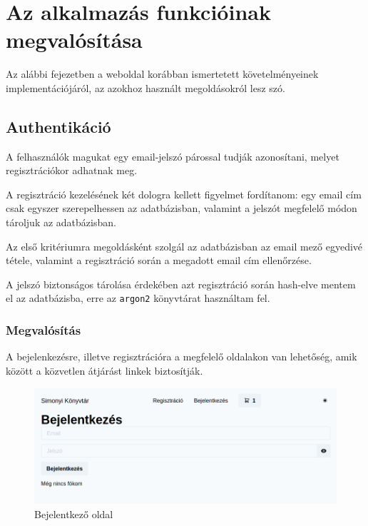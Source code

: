 \chapter{Az alkalmazás funkcióinak megvalósítása}

Az alábbi fejezetben a weboldal korábban ismertetett követelményeinek implementációjáról, az azokhoz használt
megoldásokról lesz szó.

\section{Authentikáció}

A felhasználók magukat egy email-jelszó párossal tudják azonosítani, melyet regisztrációkor adhatnak meg.

A regisztráció kezelésének két dologra kellett figyelmet fordítanom: egy email cím csak egyszer szerepelhessen
az adatbázisban, valamint a jelszót megfelelő módon tároljuk az adatbázisban.

Az első kritériumra megoldásként szolgál az adatbázisban az email mező egyedivé tétele, valamint a regisztráció során
a megadott email cím ellenőrzése.

A jelszó biztonságos tárolása érdekében azt regisztráció során hash-elve mentem el az adatbázisba, erre az \lstinline|argon2| könyvtárat
használtam fel.

\subsection{Megvalósítás}

A bejelenkezésre, illetve regisztrációra a megfelelő oldalakon van lehetőség, amik között a közvetlen átjárást linkek biztosítják.

\begin{figure}[!ht]
  \centering
  \includegraphics[width=150mm, keepaspectratio]{figures/login-screen.png}
  \caption{Bejelentkező oldal}
  \label{fig:LoginPage}
\end{figure}

